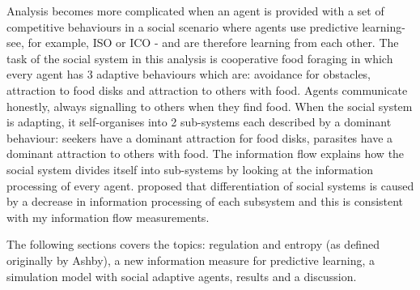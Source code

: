 Analysis becomes more complicated when an agent is provided with a set of
competitive behaviours in a social scenario where agents use predictive
learning- see, for example, ISO \citep{Porr2003rsoc} or ICO \citep{Porr2006ICO}
- and are therefore learning from each other.
The task of the social system in this analysis is cooperative food foraging
in which every agent has 3 adaptive behaviours which are:
avoidance for obstacles, attraction to food disks and attraction to others with food.
Agents communicate honestly, always signalling to others when they find food.
When the social system is adapting, it self-organises into 2 sub-systems each
described by a dominant behaviour: seekers have a dominant attraction for food
disks, parasites have a dominant attraction to others with food.
The information flow explains how the social system divides itself
into sub-systems by looking at the information processing of every agent.
\citet{Luhmann95} proposed that differentiation of social systems is
caused by a decrease in information processing of each subsystem and this
is consistent with my information flow measurements.

The following sections covers the topics: regulation and
entropy (as defined originally by Ashby), a new information measure for predictive
learning, a simulation model with social adaptive agents, results and a discussion.


